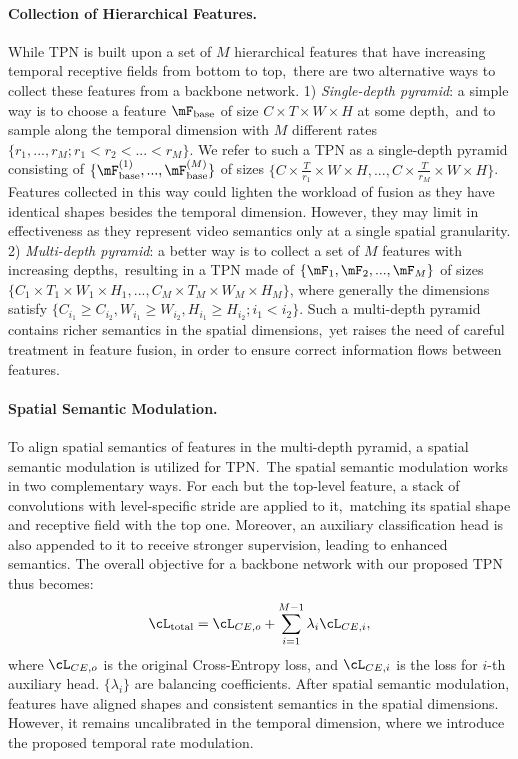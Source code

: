\documentclass[10pt,twocolumn,letterpaper]{article}
\begin{document}
\paragraph{Collection of Hierarchical Features.}
While TPN is built upon a set of $M$ hierarchical features that have increasing temporal receptive fields from bottom to top,\
there are two alternative ways to collect these features from a backbone network.
1) \emph{Single-depth pyramid}: a simple way is to choose a feature $\mF_\mathrm{base}$ of size $C \times T \times W \times H$ at some depth,\
and to sample along the temporal dimension with $M$ different rates $\{r_1, ..., r_M;r_1 < r_2 < ... < r_M\}$.
We refer to such a TPN as a single-depth pyramid consisting of $\{\mF_\mathrm{base}^{(1)}, ..., \mF_\mathrm{base}^{(M)}\}$ of sizes $\{C \times \frac{T}{r_1} \times W \times H, ..., C \times \frac{T}{r_M} \times W \times H\}$.
Features collected in this way could lighten the workload of fusion as they have identical shapes besides the temporal dimension.
However, they may limit in effectiveness as they represent video semantics only at a single spatial granularity.
2) \emph{Multi-depth pyramid}: a better way is to collect a set of $M$ features with increasing depths,\
resulting in a TPN made of $\{\mF_1, \mF_2, ..., \mF_M\}$ of sizes $\{C_1 \times T_1 \times W_1 \times H_1, ..., C_M \times T_M \times W_M \times H_M\}$,
where generally the dimensions satisfy $\{C_{i_1} \ge C_{i_2}, W_{i_1} \ge W_{i_2}, H_{i_1} \ge H_{i_2}; i_1 < i_2\}$. 
Such a multi-depth pyramid contains richer semantics in the spatial dimensions,\
yet raises the need of careful treatment in feature fusion,
in order to ensure correct information flows between features.

\paragraph{Spatial Semantic Modulation.} 

To align spatial semantics of features in the multi-depth pyramid, a spatial semantic modulation is utilized for TPN.\
The spatial semantic modulation works in two complementary ways.
For each but the top-level feature, a stack of convolutions with level-specific stride are applied to it,\
matching its spatial shape and receptive field with the top one.
Moreover, an auxiliary classification head is also appended to it to receive stronger supervision, leading to enhanced semantics.
The overall objective for a backbone network with our proposed TPN thus becomes:
\begin{align}
	\cL_\mathrm{total} = \cL_{CE,o} + \sum_{i=1}^{M-1} \lambda_i \cL_{CE,i},
\end{align}
where $\cL_{CE,o}$ is the original Cross-Entropy loss, and $\cL_{CE, i}$ is the loss for $i$-th auxiliary head. $\{\lambda_i\}$ are balancing coefficients. 
After spatial semantic modulation, features have aligned shapes and consistent semantics in the spatial dimensions.
However, it remains uncalibrated in the temporal dimension, where we introduce the proposed temporal rate modulation.
\end{document}
